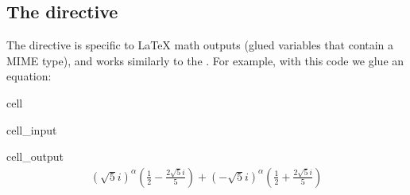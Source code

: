 \documentclass[letterpaper,10pt,english]{jupyterBook}
\begin{document}
\subsection{The  directive}
\label{\detokenize{overview:the-glue-math-directive}}
\sphinxAtStartPar
The  directive is specific to LaTeX math outputs
(glued variables that contain a  MIME type),
and works similarly to the .
For example, with this code we glue an equation:

\begin{sphinxuseclass}{cell}\begin{sphinxVerbatimInput}

\begin{sphinxuseclass}{cell_input}
\begin{sphinxVerbatim}[commandchars=\\\{\}]
   
  
  
  
  
 \PYG{p}{[}\PYG{p}{]}
\end{sphinxVerbatim}

\end{sphinxuseclass}\end{sphinxVerbatimInput}
\begin{sphinxVerbatimOutput}

\begin{sphinxuseclass}{cell_output}\begin{equation*}
\begin{split}\displaystyle \left(\sqrt{5} i\right)^{\alpha} \left(\frac{1}{2} - \frac{2 \sqrt{5} i}{5}\right) + \left(- \sqrt{5} i\right)^{\alpha} \left(\frac{1}{2} + \frac{2 \sqrt{5} i}{5}\right)\end{split}
\end{equation*}
\end{sphinxuseclass}\end{sphinxVerbatimOutput}

\end{sphinxuseclass}
\end{document}
